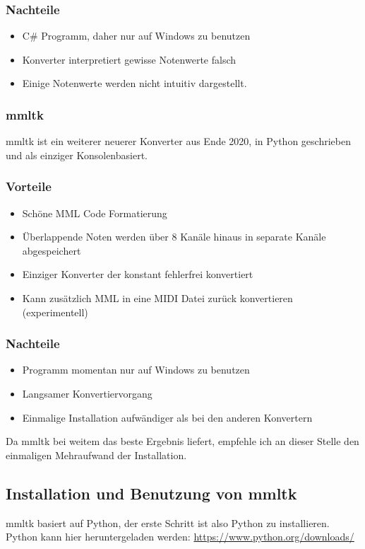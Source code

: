 \subsubsection*{Nachteile}
\begin{itemize}
	\item C\# Programm, daher nur auf Windows zu benutzen
	\item Konverter interpretiert gewisse Notenwerte falsch
	\item Einige Notenwerte werden nicht intuitiv dargestellt.
\end{itemize}

\subsubsection*{mmltk}
mmltk ist ein weiterer neuerer Konverter aus Ende 2020, in Python geschrieben und als einziger Konsolenbasiert.

\subsubsection*{Vorteile}
\begin{itemize}
	\item Schöne MML Code Formatierung
	\item Überlappende Noten werden über 8 Kanäle hinaus in separate Kanäle abgespeichert
	\item Einziger Konverter der konstant fehlerfrei konvertiert
	\item Kann zusätzlich MML in eine MIDI Datei zurück konvertieren (experimentell)
\end{itemize}

\subsubsection*{Nachteile}
\begin{itemize}
	\item Programm momentan nur auf Windows zu benutzen
	\item Langsamer Konvertiervorgang
	\item Einmalige Installation aufwändiger als bei den anderen Konvertern
\end{itemize}

Da mmltk bei weitem das beste Ergebnis liefert, empfehle ich an dieser Stelle den einmaligen Mehraufwand der Installation.

\subsection{Installation und Benutzung von mmltk}
mmltk basiert auf Python, der erste Schritt ist also Python zu installieren.
Python kann hier heruntergeladen werden: \href{https://www.python.org/downloads/}{https://www.python.org/downloads/}

